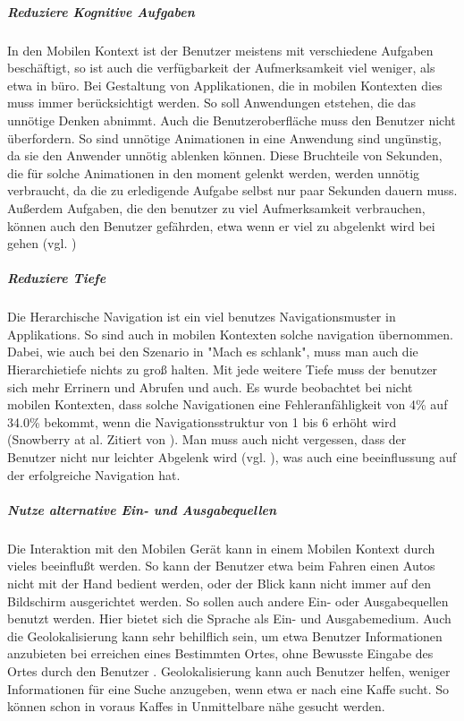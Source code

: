 \subparagraph{Reduziere Kognitive Aufgaben } 
\label{subp:reduziere_kognitive_aufgaben_}

In den Mobilen Kontext ist der Benutzer meistens mit verschiedene Aufgaben beschäftigt, so ist auch die verfügbarkeit der Aufmerksamkeit viel weniger, als etwa in büro. Bei Gestaltung von Applikationen, die in mobilen Kontexten dies muss immer berücksichtigt werden. So soll Anwendungen etstehen, die das unnötige Denken abnimmt. Auch die Benutzeroberfläche muss den Benutzer nicht überfordern. So sind unnötige Animationen in eine Anwendung sind ungünstig, da sie den Anwender unnötig ablenken können. Diese Bruchteile von Sekunden, die für solche Animationen in den moment gelenkt werden, werden unnötig verbraucht, da die zu erledigende Aufgabe selbst nur paar Sekunden dauern muss. Außerdem Aufgaben, die den benutzer zu viel Aufmerksamkeit verbrauchen, können auch den Benutzer gefährden, etwa wenn er viel zu abgelenkt wird bei gehen (vgl. \cite{Nasar:2008cc})

\subparagraph{Reduziere Tiefe} 
\label{subp:reduziere_das_w_hlen}

Die Herarchische Navigation ist ein viel benutzes Navigationsmuster in Applikations. So sind auch in mobilen Kontexten solche navigation übernommen. Dabei, wie auch bei den Szenario in "Mach es schlank", muss man auch die Hierarchietiefe nichts zu groß halten. Mit jede weitere Tiefe muss der benutzer sich mehr Errinern und Abrufen und auch. Es wurde beobachtet bei nicht mobilen Kontexten, dass solche Navigationen eine Fehleranfähligkeit von 4\% auf 34.0\% bekommt, wenn die Navigationsstruktur von 1 bis 6 erhöht wird (Snowberry at al. Zitiert von \cite{Chae:2004gp}). Man muss auch nicht vergessen, dass der Benutzer nicht nur leichter Abgelenk wird (vgl. \cite{Oulasvirta:2005vn}), was auch eine beeinflussung auf der erfolgreiche Navigation hat.

\subparagraph{Nutze alternative Ein- und Ausgabequellen}
\label{subp:nutze_alternative_eingabenger_ten}

Die Interaktion mit den Mobilen Gerät kann in einem Mobilen Kontext durch vieles beeinflußt werden. So kann der Benutzer etwa beim Fahren einen Autos nicht mit der Hand bedient werden, oder der Blick kann nicht immer auf den Bildschirm ausgerichtet werden. So sollen auch andere Ein- oder Ausgabequellen benutzt werden. Hier bietet sich die Sprache als Ein- und Ausgabemedium.
Auch die Geolokalisierung kann sehr behilflich sein, um etwa Benutzer Informationen anzubieten bei erreichen eines Bestimmten Ortes, ohne Bewusste Eingabe des Ortes durch den Benutzer . Geolokalisierung kann auch Benutzer helfen, weniger Informationen für eine Suche anzugeben, wenn etwa er nach eine Kaffe sucht. So können schon in voraus Kaffes in Unmittelbare nähe gesucht werden.


